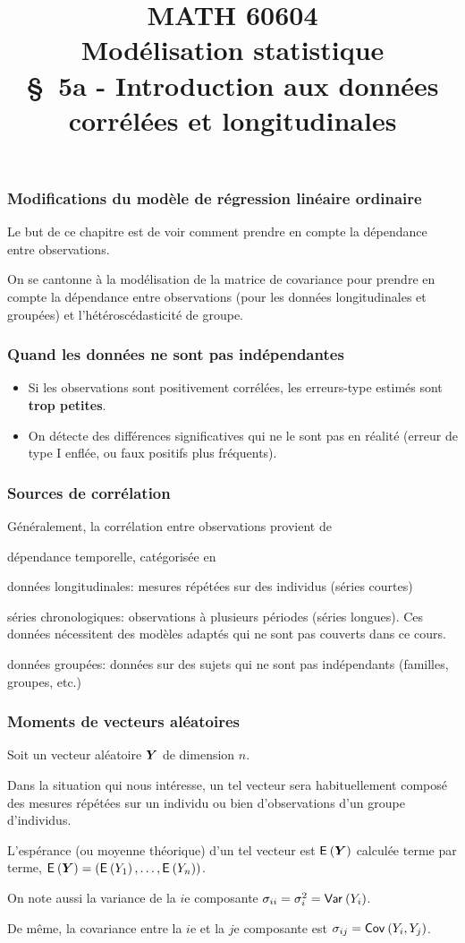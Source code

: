 \documentclass{beamer}
\title[\color{white}{MATH 60604 \S~5a - Introduction aux données corrélées et longitudinales}]{\texorpdfstring{MATH 60604 \\Modélisation statistique \\ \S~5a - Introduction aux données corrélées et longitudinales}{MATH 60604 \\Modélisation statistique \\ \S~5a - Introduction aux données corrélées et longitudinales}}
\author{}
\institute{HEC Montréal\\
Département de sciences de la décision}
\date{}
\begin{document}
\frame{\titlepage}

\begin{frame}
\frametitle{Modifications du modèle de régression linéaire ordinaire}
\bi 
\item Le but de ce chapitre est de voir comment prendre en compte la dépendance entre observations.
\item On se cantonne à la modélisation de la matrice de covariance pour prendre en compte la dépendance entre observations (pour les données longitudinales et groupées) et l'hétéroscédasticité de groupe.
\ei
\end{frame}
\begin{frame}
\frametitle{Quand les données ne sont pas indépendantes}
\begin{itemize}
\item Si les observations sont positivement corrélées, les erreurs-type estimés sont \textbf{trop petites}.
\item On détecte des différences significatives qui ne le sont pas en réalité (erreur de type I enflée, ou faux positifs plus fréquents).
\end{itemize}
\end{frame}
\begin{frame}
\frametitle{Sources de corrélation}
Généralement, la corrélation entre observations provient de
\bi
\item  dépendance temporelle, catégorisée en
\bi 
\item données longitudinales: mesures répétées sur des individus (séries courtes)
\item séries chronologiques: observations à plusieurs périodes (séries longues). Ces données nécessitent des modèles adaptés qui ne sont pas couverts dans ce cours.
\ei 
\item  données groupées: données sur des sujets qui ne sont pas indépendants (familles, groupes, etc.)
\ei
\end{frame}
\begin{frame}
\frametitle{Moments de vecteurs aléatoires}
\bi
\item Soit un vecteur aléatoire $\boldsymbol {Y}$ de dimension $n$. 
\bi
\item Dans la situation qui nous intéresse, un tel vecteur sera habituellement
composé des mesures répétées sur un individu ou bien d'observations d'un
groupe d'individus. 
\ei
\item L'espérance (ou moyenne théorique) d'un tel vecteur est ${\mathsf E}_{}\left(\boldsymbol {Y}\right)$ calculée terme par terme, ${\mathsf E}_{}\left(\boldsymbol {Y}\right) = ({\mathsf E}_{}\left(Y_1\right), \ldots, {\mathsf E}_{}\left(Y_n\right))$.
\item On note aussi la variance de la $i$e composante $\sigma_{ii} = \sigma^2_i={\mathsf{Var}_{}}\left(Y_i\right)$.
\item De même, la covariance entre la $i$e et la $j$e composante est  $\sigma_{ij}={\mathsf{Cov}_{}}\left(Y_i, Y_j\right)$.
\ei
\end{frame}
\end{document}
